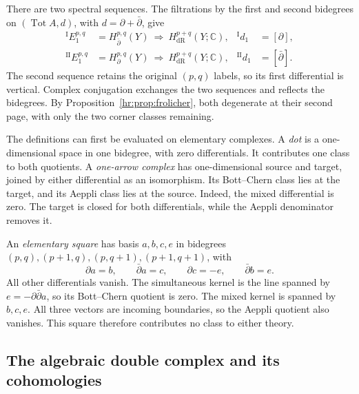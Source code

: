 There are two spectral sequences. The filtrations by the first
and second bidegrees on $(\operatorname{Tot}A,d)$, with
$d=\partial+\bar\partial$, give
\begin{equation}\label{bc:eq:two-sequences}
 \begin{aligned}
 {}^{\mathrm I}E_1^{p,q}&=H_{\bar\partial}^{p,q}(Y)
          \ \Longrightarrow\ H_{\mathrm{dR}}^{p+q}(Y;\mathbb C),
       &{}^{\mathrm I}d_1&=[\partial],\\
 {}^{\mathrm {II}}E_1^{p,q}&=H_\partial^{p,q}(Y)
          \ \Longrightarrow\ H_{\mathrm{dR}}^{p+q}(Y;\mathbb C),
       &{}^{\mathrm {II}}d_1&=[\bar\partial].
 \end{aligned}
\end{equation}
The second sequence retains the original $(p,q)$ labels, so its
first differential is vertical. Complex conjugation exchanges the
two sequences and reflects the bidegrees. By
Proposition~\ref{hr:prop:frolicher}, both degenerate at their
second page, with only the two corner classes remaining.

The definitions can first be evaluated on elementary complexes.
A \emph{dot} is a one-dimensional space in one bidegree, with
zero differentials. It contributes one class to both quotients.
A \emph{one-arrow complex} has one-dimensional source and target,
joined by either differential as an isomorphism. Its Bott--Chern
class lies at the target, and its Aeppli class lies at the source.
Indeed, the mixed differential is zero. The target is closed for
both differentials, while the Aeppli denominator removes it.

An \emph{elementary square} has basis $a,b,c,e$ in bidegrees
$(p,q),(p+1,q),(p,q+1),(p+1,q+1)$, with
\begin{equation}\label{bc:eq:square}
 \partial a=b,\qquad \bar\partial a=c,\qquad
 \partial c=-e,\qquad \bar\partial b=e.
\end{equation}
All other differentials vanish. The simultaneous kernel is the
line spanned by $e=-\partial\bar\partial a$, so its Bott--Chern
quotient is zero. The mixed kernel is spanned by $b,c,e$.
All three vectors are incoming boundaries, so the Aeppli quotient
also vanishes. This square therefore contributes no class to
either theory.

\subsection{The algebraic double complex and its cohomologies}

